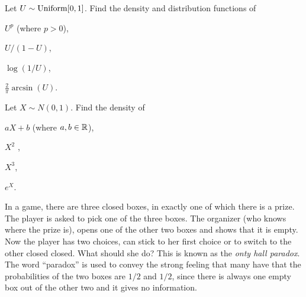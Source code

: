 \documentclass[preprint,  11pt]{amsart}
\renewcommand{\benu}{\begin{enumerate}}
\begin{document}
\medskip
\bepr Let $U\sim \mbox{Uniform}[0,1]$. Find the density and distribution functions of \begin{inparaenum}[(a)] \item $U^{p}$ (where $p>0$), \item $U/(1-U)$, \item $\log(1/U)$, \item $\frac{2}{\pi}\arcsin(U)$. \end{inparaenum}
\eepr

\medskip
\bepr Let $X\sim N(0,1)$. Find the density of \begin{inparaenum}[(a)] \item $aX+b$ (where $a,b\in \mathbb{R}$), \item $X^{2}$ , \item $X^{3}$, \item $e^{X}$. \end{inparaenum}
\eepr



\medskip
\bepr In a game, there are three closed boxes, in exactly one of which there is a prize. The player is asked to pick one of the three boxes. The organizer (who knows where the prize is), opens one of the other two boxes and shows that it is empty. Now the player has two choices, can stick to her first choice or to switch to the other closed closed. What should she do? This is known as the {\em onty hall paradox}. The word ``paradox'' is used to convey the strong feeling that many have that the probabilities of the two boxes are $1/2$ and $1/2$, since there is always one empty box out of the other two and it gives no information.
\end{document}
